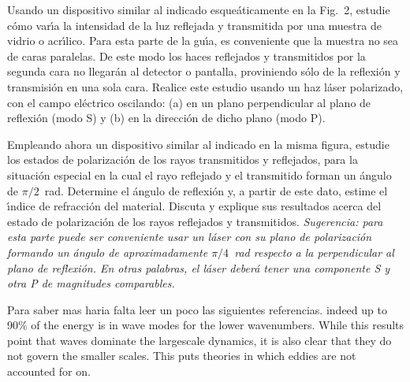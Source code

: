 \documentclass[laboratorio]{guia}
\begin{document}
Usando un dispositivo similar al indicado esque\'aticamente en la Fig.~2, 
estudie c\'omo var\'\i a la intensidad de la luz reflejada y transmitida por 
una muestra de vidrio o acr\'\i lico. Para esta parte de la gu\'\i a, es 
conveniente que la muestra no sea de caras paralelas. De este modo los haces
reflejados y transmitidos por la segunda cara no llegar\'an al detector o
pantalla, proviniendo s\'olo de la reflexi\'on y transmisi\'on en una sola 
cara. Realice este estudio usando un haz l\'aser polarizado, con el campo
el\'ectrico oscilando: (a) en un plano perpendicular al plano de reflexi\'on 
(modo S) y (b) en la direcci\'on de dicho plano (modo P).

Empleando ahora un dispositivo similar al indicado en la misma figura, estudie
los estados de polarizaci\'on de los rayos transmitidos y reflejados, para la
situaci\'on especial en la cual el rayo reflejado y el transmitido forman 
un \'angulo de $\pi/2$~rad. Determine el \'angulo de reflexi\'on y, a 
partir de este dato, estime el \'\i ndice de refracci\'on del material. 
Discuta y explique sus resultados acerca del estado de polarizaci\'on de los
rayos reflejados y transmitidos. {\it Sugerencia: para esta parte puede 
ser conveniente usar un l\'aser con su plano de polarizaci\'on formando un
\'angulo de aproximadamente $\pi/4$~rad respecto a la perpendicular al plano
de reflexi\'on. En otras palabras, el l\'aser deber\'a tener una componente
S y otra P de magnitudes comparables. }

\begin{sabermas}
Para saber mas haria falta leer un poco las siguientes referencias.
indeed up to 90\% of the energy is in wave modes for the lower
wavenumbers. While this results point that waves dominate the largescale
dynamics, it is also clear that they do not govern the smaller scales.
This puts theories in which eddies are not accounted for on.
\end{sabermas}

% 
% 
\end{document}
